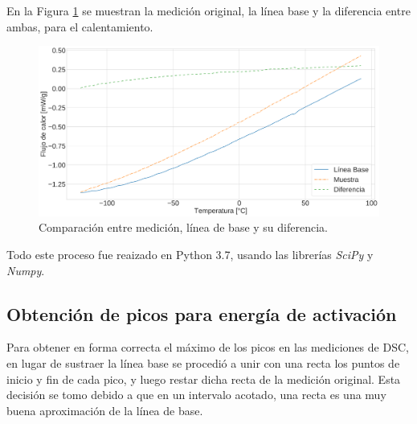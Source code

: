 \documentclass[12pt]{article}
\theoremstyle{definition}
\theoremstyle{remark}
\begin{document}
En la Figura \ref{Comparison} se muestran la medición original, la línea base y la diferencia entre ambas, para el calentamiento.

\begin{figure}[H]
	\centering
	\includegraphics[scale=0.2]{img/NiPoorHeatingExample}
	\caption{Comparación entre medición, línea de base y su diferencia.}
	\label{Comparison}
\end{figure}


Todo este proceso fue reaizado en Python 3.7, usando las librerías \textit{SciPy} y \textit{Numpy}.

\subsection{Obtención de picos para energía de activación}

Para obtener en forma correcta el máximo de los picos en las mediciones de DSC, en lugar de sustraer la línea base se procedió a unir con una recta los puntos de inicio y fin de cada pico, y luego restar dicha recta de la medición original. Esta decisión se tomo debido a que en un intervalo acotado, una recta es una muy buena aproximación de la línea de base.
\end{document}
